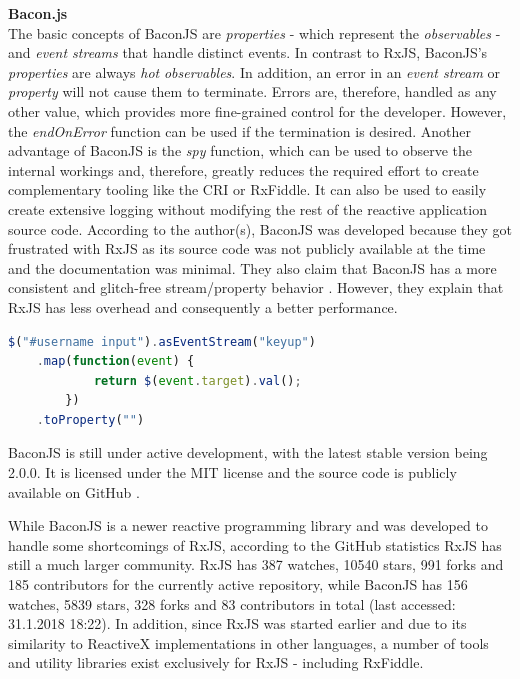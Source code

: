 	\noindent\textbf{Bacon.js}\\
	The basic concepts of BaconJS \cite{BaconJS} are \emph{properties} - which represent the \emph{observables} - and \emph{event streams} that handle distinct events. 
	In contrast to RxJS, BaconJS's \emph{properties} are always \emph{hot} \emph{observables}. In addition, an error in an \emph{event stream} or \emph{property} will not cause them to terminate. Errors are, therefore, handled as any other value, which provides more fine-grained control for the developer. However, the \emph{endOnError} function can be used if the termination is desired. 
	Another advantage of BaconJS is the \emph{spy} function, which can be used to observe the internal workings and, therefore, greatly reduces the required effort to create complementary tooling like the CRI or RxFiddle. It can also be used to easily create extensive logging without modifying the rest of the reactive application source code. According to the author(s), BaconJS was developed because they got frustrated with RxJS as its source code was not publicly available at the time and the documentation was minimal. They also claim that BaconJS has a more consistent and glitch-free stream/property behavior \cite{BaconJSRepo}. However, they explain that RxJS has less overhead and consequently a better performance. 
\begin{lstlisting}[language=JavaScript, caption={Example of BaconJS code.},label={lst:Bacon}]
$("#username input").asEventStream("keyup")
	.map(function(event) {
			return $(event.target).val();
		})
	.toProperty("")
\end{lstlisting}
	BaconJS is still under active development, with the latest stable version being 2.0.0. It is licensed under the MIT license and the source code is publicly available on GitHub \cite{BaconJSRepo}.

	While BaconJS is a newer reactive programming library and was developed to handle some shortcomings of RxJS, according to the GitHub statistics RxJS has still a much larger community. RxJS has 387 watches, 10540 stars, 991 forks and 185 contributors for the currently active repository, while BaconJS has 156 watches, 5839 stars, 328 forks and 83 contributors in total (last accessed: 31.1.2018 18:22).
	In addition, since RxJS was started earlier and due to its similarity to ReactiveX implementations in other languages, a number of tools and utility libraries exist exclusively for RxJS - including RxFiddle.

